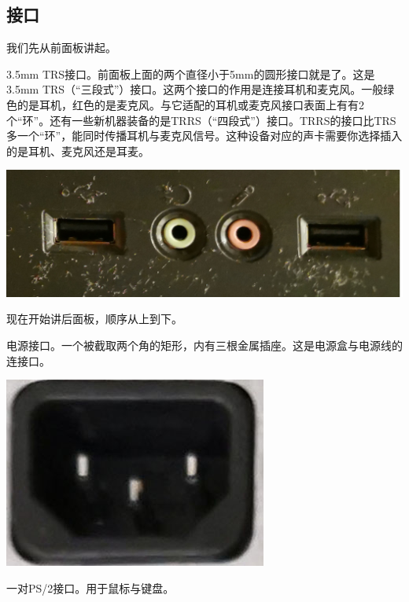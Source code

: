 \subsection{接口}
我们先从前面板讲起。\par
3.5mm TRS接口。前面板上面的两个直径小于5mm的圆形接口就是了。这是3.5mm TRS（“三段式”）接口。这两个接口的作用是连接耳机和麦克风。一般绿色的是耳机，红色的是麦克风。与它适配的耳机或麦克风接口表面上有有2个“环”。还有一些新机器装备的是TRRS（“四段式”）接口。TRRS的接口比TRS多一个“环”，能同时传播耳机与麦克风信号。这种设备对应的声卡需要你选择插入的是耳机、麦克风还是耳麦。
\begin{center}
	\includegraphics[width=0.7\linewidth]{pic/Box1}
\end{center}\par
现在开始讲后面板，顺序从上到下。\par
电源接口。一个被截取两个角的矩形，内有三根金属插座。这是电源盒与电源线的连接口。
\begin{center}
	\includegraphics[width=0.7\linewidth]{pic/Power}
\end{center}\par
一对PS/2接口。用于鼠标与键盘。
